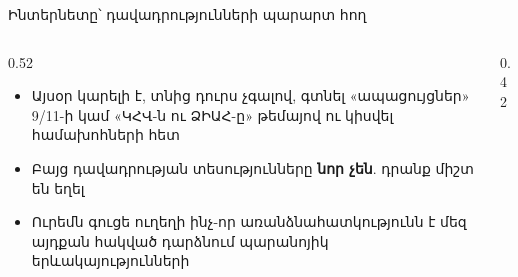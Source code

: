 \begin{frame}{Ինտերնետը՝ դավադրությունների պարարտ հող}
  \begin{columns}[c]
    \begin{column}{0.52\textwidth}
      \begin{itemize}
        \item Այսօր կարելի է, տնից դուրս չգալով, գտնել «ապացույցներ» 9/11-ի կամ «ԿՀՎ-ն ու ՁԻԱՀ-ը» թեմայով ու կիսվել համախոհների հետ
        \item<2-> Բայց դավադրության տեսությունները \textbf{նոր չեն}. դրանք միշտ են եղել
        \item<3-> Ուրեմն գուցե ուղեղի ինչ-որ առանձնահատկությունն է մեզ այդքան հակված դարձնում պարանոյիկ երևակայությունների
      \end{itemize}
    \end{column}
    \begin{column}{0.42\textwidth}
    \end{column}
  \end{columns}
\end{frame}

